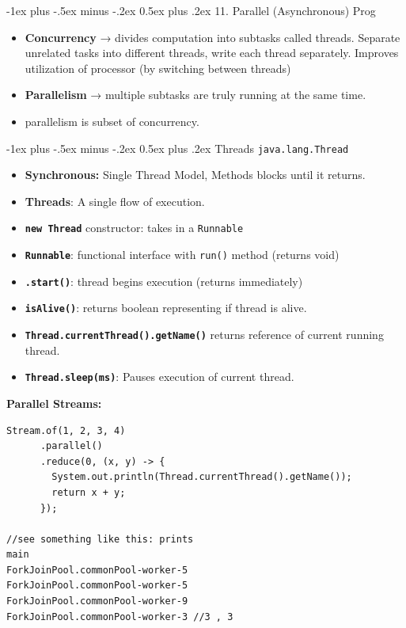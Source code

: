 \documentclass[12pt, landscape]{article}
\makeatletter
\newcommand{\code}[1]{\colorbox{gray!25!}{\lstinline|#1|}}
\renewcommand{\section}{\@startsection{section}{1}{0mm}%
                                {-1ex plus -.5ex minus -.2ex}%
                                {0.5ex plus .2ex}%
                                {\normalfont\large\bfseries}}
\makeatother
\begin{document}
\begin{multicols*}{3}
\section{11. Parallel (Asynchronous) Prog}
\begin{itemize}
\item \textbf{Concurrency} → divides computation into subtasks called threads. Separate unrelated tasks into different threads, write each thread separately. Improves utilization of processor (by switching between threads)
\item \textbf{Parallelism} → multiple subtasks are truly running at the same time.
\item parallelism is subset of concurrency.
\end{itemize}

\vfill\null
\columnbreak

\section{Threads \code{java.lang.Thread}}
\begin{itemize}
\item \textbf{Synchronous:} Single Thread Model, Methods blocks until it returns.
\item \textbf{Threads}: A single flow of execution.
\item \textbf{\code{new Thread}} constructor: takes in a \code{Runnable}
\item \textbf{\code{Runnable}}: functional interface with \code{run()} method (returns void)
\item \textbf{\code{.start()}}: thread begins execution (returns immediately)
\item \textbf{\code{isAlive()}}: returns boolean representing if thread is alive.
\item \textbf{\code{Thread.currentThread().getName()}} returns reference of current running thread.\
\item \textbf{\code{Thread.sleep(ms)}}: Pauses execution of current thread.
\end{itemize}

\textbf{Parallel Streams:}
\begin{lstlisting}
Stream.of(1, 2, 3, 4)
      .parallel()
      .reduce(0, (x, y) -> { 
        System.out.println(Thread.currentThread().getName()); 
        return x + y; 
      });

//see something like this: prints
main
ForkJoinPool.commonPool-worker-5
ForkJoinPool.commonPool-worker-5
ForkJoinPool.commonPool-worker-9
ForkJoinPool.commonPool-worker-3 //3 , 3
\end{lstlisting}


\end{multicols*}
\end{document}
